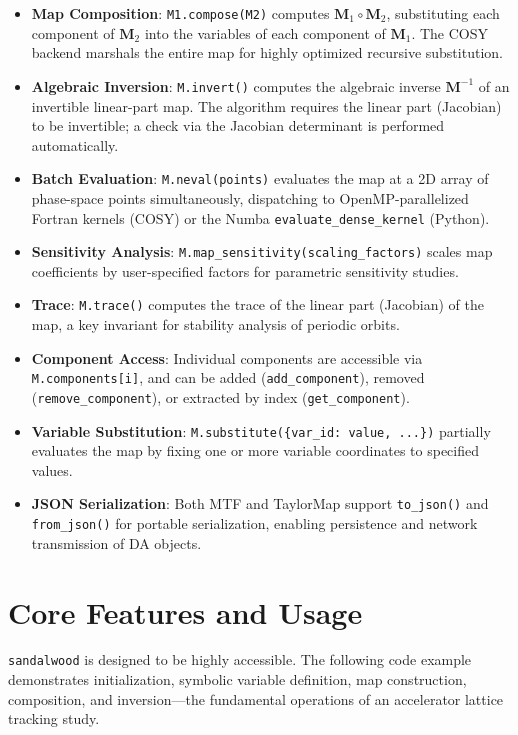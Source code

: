 \documentclass[aps,prb,reprint,superscriptaddress,nofootinbib]{revtex4-2}
\begin{document}
\begin{itemize}
    \item \textbf{Map Composition}: \texttt{M1.compose(M2)} computes $\mathbf{M}_1 \circ \mathbf{M}_2$, substituting each component of $\mathbf{M}_2$ into the variables of each component of $\mathbf{M}_1$. The COSY backend marshals the entire map for highly optimized recursive substitution.
    \item \textbf{Algebraic Inversion}: \texttt{M.invert()} computes the algebraic inverse $\mathbf{M}^{-1}$ of an invertible linear-part map. The algorithm requires the linear part (Jacobian) to be invertible; a check via the Jacobian determinant is performed automatically.
    \item \textbf{Batch Evaluation}: \texttt{M.neval(points)} evaluates the map at a 2D array of phase-space points simultaneously, dispatching to OpenMP-parallelized Fortran kernels (COSY) or the Numba \texttt{evaluate\_dense\_kernel} (Python).
    \item \textbf{Sensitivity Analysis}: \texttt{M.map\_sensitivity(scaling\_factors)} scales map coefficients by user-specified factors for parametric sensitivity studies.
    \item \textbf{Trace}: \texttt{M.trace()} computes the trace of the linear part (Jacobian) of the map, a key invariant for stability analysis of periodic orbits.
    \item \textbf{Component Access}: Individual components are accessible via \texttt{M.components[i]}, and can be added (\texttt{add\_component}), removed (\texttt{remove\_component}), or extracted by index (\texttt{get\_component}).
    \item \textbf{Variable Substitution}: \texttt{M.substitute(\{var\_id: value, ...\})} partially evaluates the map by fixing one or more variable coordinates to specified values.
    \item \textbf{JSON Serialization}: Both MTF and TaylorMap support \texttt{to\_json()} and \texttt{from\_json()} for portable serialization, enabling persistence and network transmission of DA objects.
\end{itemize}

\section{Core Features and Usage}
\label{sec:usage}

\texttt{sandalwood} is designed to be highly accessible. The following code example demonstrates initialization, symbolic variable definition, map construction, composition, and inversion---the fundamental operations of an accelerator lattice tracking study.
\end{document}

